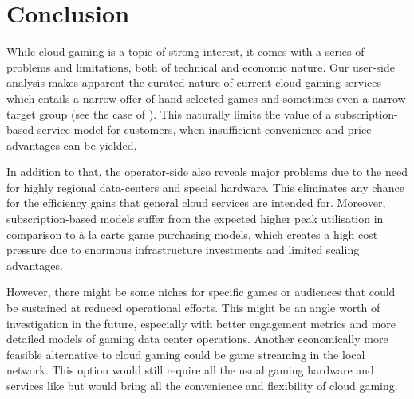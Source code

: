 \section{Conclusion}
\label{sec:conclusion}

While cloud gaming is a topic of strong interest, it comes with a series of problems and limitations, both of technical and economic nature. Our user-side analysis makes apparent the curated nature of current cloud gaming services which entails a narrow offer of hand-selected games and sometimes even a narrow target group (see the case of \psnow). This naturally limits the value of a subscription-based service model for customers, when insufficient convenience and price advantages can be yielded.


In addition to that, the operator-side also reveals major problems due to the need for highly regional data-centers and special hardware. This eliminates any chance for the efficiency gains that general cloud services are intended for. Moreover, subscription-based models suffer from the expected higher peak utilisation in comparison to à la carte game purchasing models, which creates a high cost pressure due to enormous infrastructure investments and limited scaling advantages. 

However, there might be some niches for specific games or audiences that could be sustained at reduced operational efforts. This might be an angle worth of investigation in the future, especially with better engagement metrics and more detailed models of gaming data center operations. Another economically more feasible alternative to cloud gaming could be game streaming in the local network. This option would still require all the usual gaming hardware and services like \steam but would bring all the convenience and flexibility of cloud gaming.
